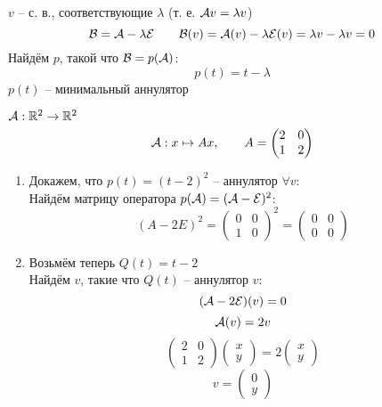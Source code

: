 \begin{exmpls}
	\item $ v $ -- с. в., соответствующие $ \lambda $ (т. е. $ \mathcal{A}v = \lambda v $)
	$$ \mathcal{B} = \mathcal{A} - \lambda\mathcal{E} \qquad \mathcal{B}(v) = \mathcal{A}(v) - \lambda \mathcal{E}(v) = \lambda v - \lambda v = 0 $$
	Найдём $ p $, такой что $ \mathcal{B} = p(\mathcal{A}) $:
	$$ p(t) = t - \lambda $$
	$ p(t) $ -- минимальный аннулятор
	\item $ \mathcal{A} : \mathbb{R}^2 \to \mathbb{R}^2 $
	$$ \mathcal{A} : x \mapsto Ax, \qquad A =
	\begin{pmatrix}
		2 & 0 \\
		1 & 2
	\end{pmatrix} $$
	\begin{enumerate}
		\item Докажем, что $ p(t) = (t - 2)^2 $ -- аннулятор $ \forall v $: \\
		Найдём матрицу оператора $ p(\mathcal{A}) = (\mathcal{A} - \mathcal{E})^2 $:
		$$ (A - 2E)^2 =
		\begin{pmatrix}
			0 & 0 \\
			1 & 0
		\end{pmatrix}^2 =
		\begin{pmatrix}
			0 & 0 \\
			0 & 0
		\end{pmatrix} $$
		\item Возьмём теперь $ Q(t) = t - 2 $ \\
		Найдём $ v $, такие что $ Q(t) $ -- аннулятор $ v $:
		$$ (\mathcal{A} - 2\mathcal{E})(v) = 0 $$
		$$ \mathcal{A}(v) = 2v $$
		$$
		\begin{pmatrix}
			2 & 0 \\
			1 & 2
		\end{pmatrix}
		\begin{pmatrix}
			x \\
			y
		\end{pmatrix} = 2
		\begin{pmatrix}
			x \\
			y
		\end{pmatrix} $$
		$$ v =
		\begin{pmatrix}
			0 \\
			y
		\end{pmatrix} $$
	\end{enumerate}
\end{exmpls}

